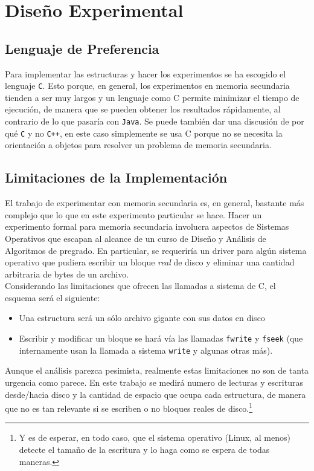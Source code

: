 \documentclass[12pt,letterpaper]{report}
\begin{document}
\newpage
\section{Diseño Experimental}

\subsection{Lenguaje de Preferencia}

Para implementar las estructuras y hacer los experimentos se ha escogido el lenguaje \texttt{C}. Esto porque, en general, los experimentos en memoria secundaria tienden a ser muy largos y un lenguaje como C permite minimizar el tiempo de ejecución, de manera que se pueden obtener los resultados rápidamente, al contrario de lo que pasaría con \texttt{Java}. Se puede también dar una discusión de por qué \texttt{C} y no \texttt{C++}, en este caso simplemente se usa C porque no se necesita la orientación a objetos para resolver un problema de memoria secundaria.

\subsection{Limitaciones de la Implementación}

El trabajo de experimentar con memoria secundaria es, en general, bastante más complejo que lo que en este experimento particular se hace. Hacer un experimento formal para memoria secundaria involucra aspectos de Sistemas Operativos que escapan al alcance de un curso de Diseño y Análisis de Algoritmos de pregrado. En particular, se requeriría un driver para algún sistema operativo que pudiera escribir un bloque \emph{real} de disco y eliminar una cantidad arbitraria de bytes de un archivo.\\

Considerando las limitaciones que ofrecen las llamadas a sistema de C, el esquema será el siguiente:

\begin{itemize}
\item Una estructura será un sólo archivo gigante con sus datos en disco
\item Escribir y modificar un bloque se hará vía las llamadas \texttt{fwrite} y \texttt{fseek} (que internamente usan la llamada a sistema \texttt{write} y algunas otras más).
\end{itemize}

Aunque el análisis parezca pesimista, realmente estas limitaciones no son de tanta urgencia como parece. En este trabajo se medirá numero de lecturas y escrituras desde/hacia disco y la cantidad de espacio que ocupa cada estructura, de manera que no es tan relevante si se escriben o no bloques reales de disco.\footnote{Y es de esperar, en todo caso, que el sistema operativo (Linux, al menos) detecte el tamaño de la escritura y lo haga como se espera de todas maneras.}\\
\end{document}
